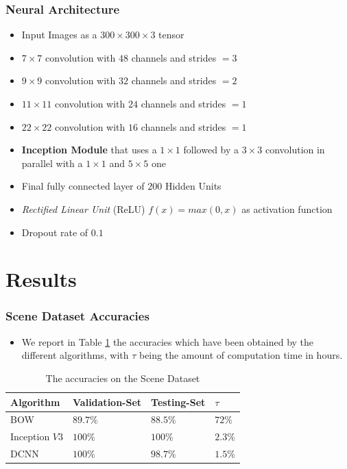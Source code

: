 \documentclass[a0, portrait]{IWIposter}
\begin{document}
\begin{multicols}{3}
\subsubsection*{Neural Architecture}
	\begin{itemize}
		\item Input Images as a $300 \times 300 \times 3$ tensor
		\item $7 \times 7$ convolution with $48$ channels and strides $= 3$
		\item $9 \times 9$ convolution with $32$ channels and strides $= 2$ 
		\item $11 \times 11$ convolution with $24$ channels and strides $= 1$ 
		\item $22 \times 22$ convolution with $16$ channels and strides $= 1$ 
		\item \textbf{Inception Module} that uses a $1 \times 1$ followed by a $3 \times 3$ convolution in parallel with a $1 \times 1$ and $5 \times 5$ one
		\item Final fully connected layer of $200$ Hidden Units
		\item \textit{Rectified Linear Unit} (ReLU) $f(x) = max(0,x)$ as activation function
		\item Dropout rate of $0.1$

	\end{itemize}


\section*{Results}

\centering
\subsubsection*{Scene Dataset Accuracies}

\begin{itemize}
	\item We report in Table \ref{tab:tab1} the accuracies which have been obtained by the different algorithms, with $\tau$ being the amount of computation time in hours.
\end{itemize}

\begin{table}
\centering
\caption{The accuracies on the Scene Dataset}
\label{tab:tab1}
\begin{tabular}{>{\rowmac}l|>{\rowmac}l|>{\rowmac}l|>{\rowmac}l<{\clearrow}}
\textbf{Algorithm}   & \textbf{Validation-Set} & \textbf{Testing-Set} & \textbf{$\tau$}  \\ \hline
        BOW                    & $89.7\%$             & $88.5\%$           & $72\%$    \\
        Inception $V3$         & $100\%$              & $100\%$            & $2.3\%$     \\
        DCNN                   & $100\%$              & $98.7\%$           & $1.5\%$          \\
\end{tabular}\label{tab:tab1}
\end{table}


\end{multicols}
\end{document}
